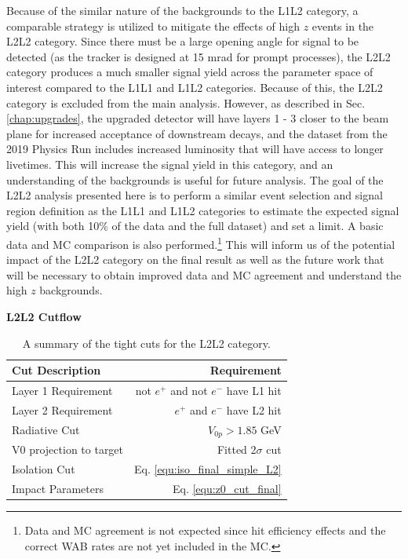 Because of the similar nature of the backgrounds to the L1L2 category, a comparable strategy is utilized to mitigate the effects of high $z$ events in the L2L2 category. Since there must be a large opening angle for signal to be detected (as the tracker is designed at 15 mrad for prompt processes), the L2L2 category produces a much smaller signal yield across the parameter space of interest compared to the L1L1 and L1L2 categories. Because of this, the L2L2 category is excluded from the main analysis. However, as described in Sec. \ref{chap:upgrades}, the upgraded detector will have layers 1 - 3 closer to the beam plane for increased acceptance of downstream decays, and the dataset from the 2019 Physics Run includes increased luminosity that will have access to longer livetimes. This will increase the signal yield in this category, and an understanding of the backgrounds is useful for future analysis. The goal of the L2L2 analysis presented here is to perform a similar event selection and signal region definition as the L1L1 and L1L2 categories to estimate the expected signal yield (with both 10\% of the data and the full dataset) and set a limit. A basic data and MC comparison is also performed.\footnote{Data and MC agreement is not expected since hit efficiency effects and the correct WAB rates are not yet included in the MC.} This will inform us of the potential impact of the L2L2 category on the final result as well as the future work that will be necessary to obtain improved data and MC agreement and understand the high $z$ backgrounds.

\textbf{L2L2 Cutflow}

\begin{table}[!hb] 
    \centering
    \begin{tabular}{lr}
        \toprule
        \textbf{Cut Description} & \textbf{Requirement} \\
        \midrule
        Layer 1 Requirement & not $e^+$ and not $e^-$ have L1 hit \\
        Layer 2 Requirement & $e^+$ and $e^-$ have L2 hit \\
        Radiative Cut & $V_{0p} > 1.85$ GeV \\
        V0 projection to target & Fitted 2$\sigma$ cut \\
        Isolation Cut & Eq. \ref{equ:iso_final_simple_L2} \\ 
        Impact Parameters & Eq. \ref{equ:z0_cut_final} \\
        \bottomrule
    \end{tabular}
    \caption{A summary of the tight cuts for the L2L2 category.}
    \label{tab:L2L2cuts}
\end{table}

